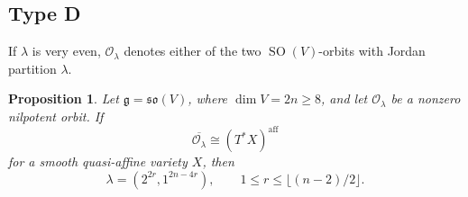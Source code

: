 \documentclass[10pt,a4paper]{amsart}
\newtheorem{proposition}[theorem]{Proposition}
\newcommand{\aff}{\mathrm{aff}}
\begin{document}
\subsection{Type D}
\label{sec:typeD}

If $\lambda$ is very even, $\mathcal O_\lambda$ denotes
either of the two $\operatorname{SO}(V)$-orbits with Jordan partition
$\lambda$.

\begin{proposition}\label{prop:typeD}
Let $\mathfrak g=\mathfrak{so}(V)$, where $\dim V=2n\geq8$, and let
$\mathcal O_\lambda$ be a nonzero nilpotent orbit. If
\[
\overline{\mathcal O_\lambda}\cong(T^*X)^{\aff}
\]
for a smooth quasi-affine variety $X$, then
\[
\lambda=(2^{2r},1^{2n-4r}),
\qquad
1\leq r\leq\lfloor(n-2)/2\rfloor.
\]
\end{proposition}
\end{document}
